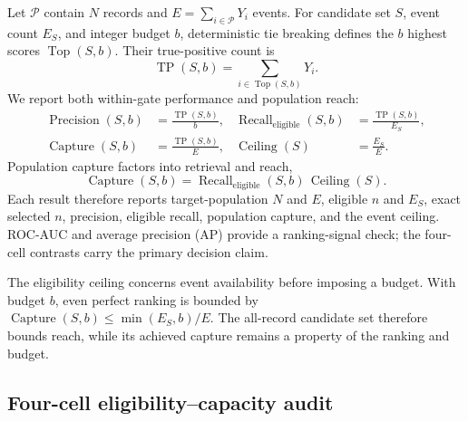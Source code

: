 \documentclass{article}
\newcommand{\topset}{\operatorname{Top}}
\newcommand{\capture}{\operatorname{Capture}}
\newcommand{\receligible}{\operatorname{Recall}_{\mathrm{eligible}}}
\newcommand{\ceiling}{\operatorname{Ceiling}}
\begin{document}
Let $\mathcal P$ contain $N$ records and $E=\sum_{i\in\mathcal P}Y_i$ events.
For candidate set $S$, event count $E_S$, and integer budget $b$, deterministic
tie breaking defines the $b$ highest scores $\topset(S,b)$. Their true-positive
count is
\begin{equation}
  \operatorname{TP}(S,b)=\sum_{i\in\topset(S,b)}Y_i.
  \label{eq:tp}
\end{equation}
We report both within-gate performance and population reach:
\begin{align}
  \operatorname{Precision}(S,b)&=\frac{\operatorname{TP}(S,b)}{b}, &
  \receligible(S,b)&=\frac{\operatorname{TP}(S,b)}{E_S},
  \label{eq:within_metrics}\\
  \capture(S,b)&=\frac{\operatorname{TP}(S,b)}{E}, &
  \ceiling(S)&=\frac{E_S}{E}.
  \label{eq:population_metrics}
\end{align}
Population capture factors into retrieval and reach,
\begin{equation}
  \capture(S,b)=\receligible(S,b)\,\ceiling(S).
  \label{eq:identity}
\end{equation}
Each result therefore reports target-population $N$ and $E$, eligible $n$ and
$E_S$, exact selected $n$, precision, eligible recall, population capture, and
the event ceiling. ROC-AUC and average precision (AP) provide a ranking-signal
check; the four-cell contrasts carry the primary decision claim.

The eligibility ceiling concerns event availability before imposing a budget.
With budget $b$, even perfect ranking is bounded by
$\capture(S,b)\leq\min(E_S,b)/E$. The all-record candidate set therefore bounds
reach, while its achieved capture remains a property of the ranking and budget.

\subsection{Four-cell eligibility--capacity audit}
\end{document}
